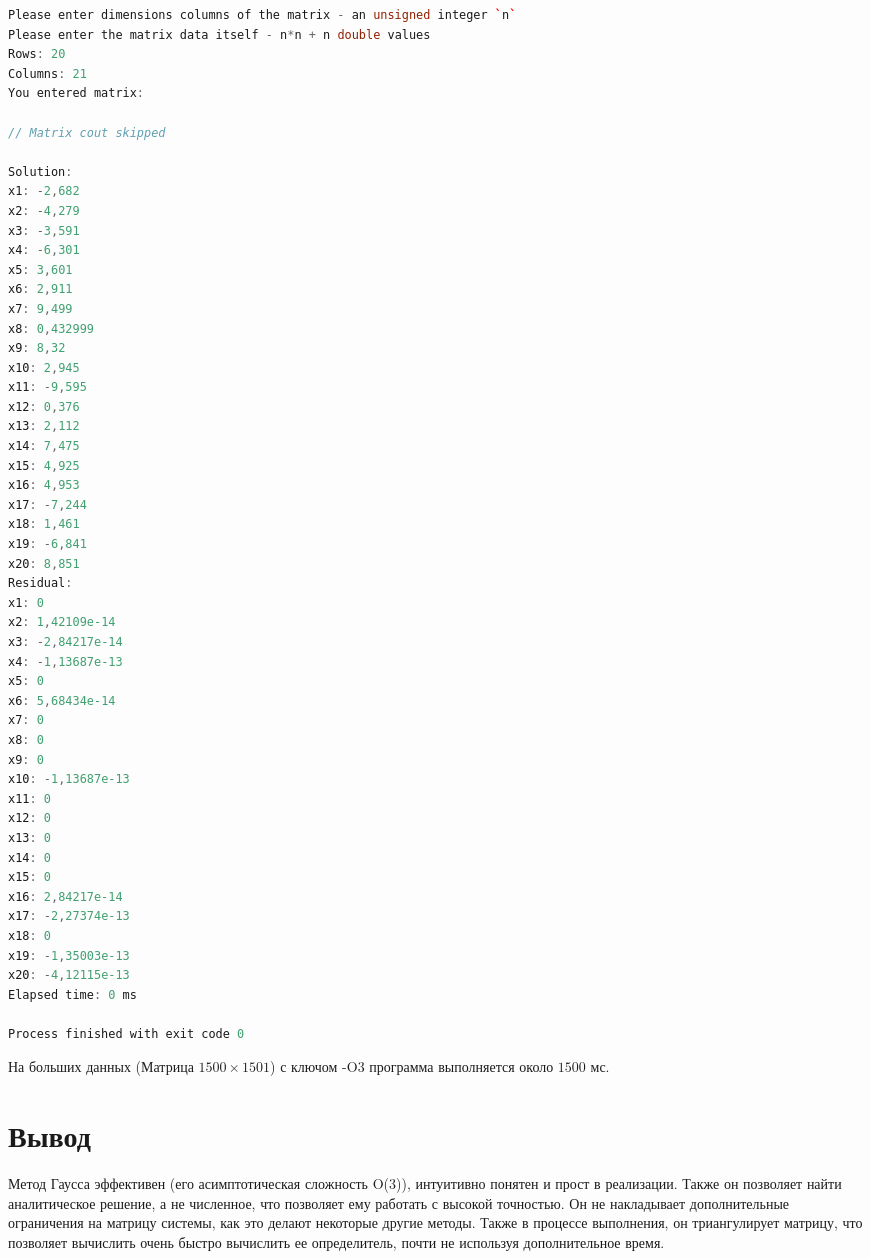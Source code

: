 \documentclass[12pt]{article}
\begin{document}
\begin{adjustbox}{width=\textwidth, center}
\begin{lstlisting}[language=C++, caption=Ввод из файла]
Please enter dimensions columns of the matrix - an unsigned integer `n`
Please enter the matrix data itself - n*n + n double values
Rows: 20
Columns: 21
You entered matrix:

// Matrix cout skipped

Solution:
x1: -2,682
x2: -4,279
x3: -3,591
x4: -6,301
x5: 3,601
x6: 2,911
x7: 9,499
x8: 0,432999
x9: 8,32
x10: 2,945
x11: -9,595
x12: 0,376
x13: 2,112
x14: 7,475
x15: 4,925
x16: 4,953
x17: -7,244
x18: 1,461
x19: -6,841
x20: 8,851
Residual:
x1: 0
x2: 1,42109e-14
x3: -2,84217e-14
x4: -1,13687e-13
x5: 0
x6: 5,68434e-14
x7: 0
x8: 0
x9: 0
x10: -1,13687e-13
x11: 0
x12: 0
x13: 0
x14: 0
x15: 0
x16: 2,84217e-14
x17: -2,27374e-13
x18: 0
x19: -1,35003e-13
x20: -4,12115e-13
Elapsed time: 0 ms

Process finished with exit code 0


\end{lstlisting}
\end{adjustbox}

На больших данных (Матрица $1500 \times 1501$) с ключом -O3 программа выполняется около $1500$ мс.

\section{Вывод}
Метод Гаусса эффективен (его асимптотическая сложность O(3)), интуитивно понятен и прост в реализации. Также он позволяет найти аналитическое решение, а не численное, что позволяет ему работать с высокой точностью. Он не накладывает дополнительные ограничения на матрицу системы, как это делают некоторые другие методы. Также в процессе выполнения, он триангулирует матрицу, что позволяет вычислить очень быстро вычислить ее определитель, почти не используя дополнительное время.
\end{document}

